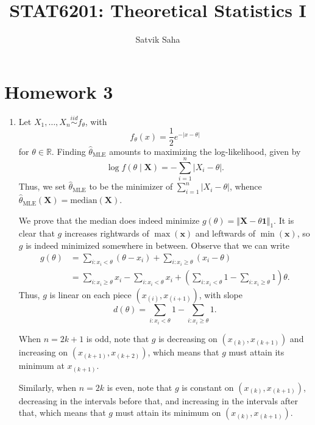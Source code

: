 \documentclass[11pt]{article}
\title{\bfseries STAT6201: Theoretical Statistics I}
\author{Satvik Saha}
\date{}
\newcommand{\R}{\mathbb{R}}
\newcommand{\norm}[1]{\Vert #1 \Vert}
\newcommand{\MLE}{\text{MLE}}
\begin{document}
    \maketitle

    \section*{Homework 3}

    \begin{enumerate}
        \item Let $X_1, \dots, X_n \overset{iid}{\sim} f_\theta$, with \[
            f_\theta(x) = \frac{1}{2} e^{- |x - \theta|}
        \] for $\theta \in \R$.
        Finding $\hat{\theta}_{\MLE}$ amounts to maximizing the log-likelihood,
        given by \[
            \log{f(\theta\mid \bm{X})} = - \sum_{i = 1}^n |X_i - \theta|.
        \] Thus, we set $\hat{\theta}_{\MLE}$ to be the minimizer of $\sum_{i =
        1}^n |X_i - \theta|$, whence $\hat{\theta}_{\MLE}(\bm{X}) =
        \text{median}(\bm{X})$.

        We prove that the median does indeed minimize $g(\theta) = \norm{\bm{X}
        - \theta\bm{1}}_1$.
        It is clear that $g$ increases rightwards of $\max(\bm{x})$ and
        leftwards of $\min(\bm{x})$, so $g$ is indeed minimized somewhere in
        between.
        Observe that we can write \begin{align*}
            g(\theta)
                &= \sum_{i\colon x_i < \theta} (\theta - x_i) + \sum_{i\colon x_i \geq \theta} (x_i - \theta) \\
                &= \sum_{i\colon x_i \geq \theta} x_i - \sum_{i\colon x_i < \theta} x_i + \left(\sum_{i\colon x_i < \theta} 1 - \sum_{i\colon x_i \geq \theta} 1\right) \theta.
        \end{align*}
        Thus, $g$ is linear on each piece $(x_{(i)}, x_{(i+1)})$, with slope \[
            d(\theta) = \sum_{i\colon x_i < \theta} 1 - \sum_{i\colon x_i \geq \theta} 1.
        \]

        When $n = 2k + 1$ is odd, note that $g$ is decreasing on $(x_{(k)},
        x_{(k+1)})$ and increasing on $(x_{(k+1)}, x_{(k+2)})$, which means
        that $g$ must attain its minimum at $x_{(k+1)}$.

        Similarly, when $n = 2k$ is even, note that $g$ is constant on
        $(x_{(k)}, x_{(k + 1)})$, decreasing in the intervals before that, and
        increasing in the intervals after that, which means that $g$ must
        attain its minimum on $(x_{(k)}, x_{(k + 1)})$.


\end{enumerate}
\end{document}

